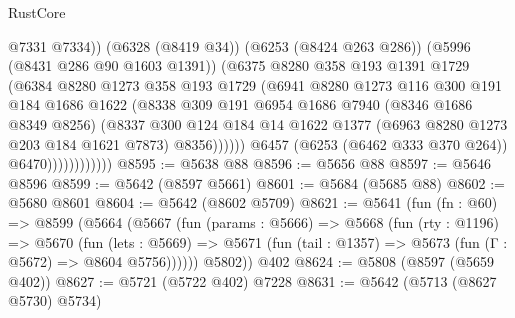 \begin{lexlean}{RustCore}
\begin{coremodule}
                                  @7331
                                  @7334))
                              (@6328 (@8419 @34))
                              (@6253 (@8424 @263 @286))
                              (@5996 (@8431 @286 @90 @1603 @1391))
                              (@6375
                                @8280
                                @358
                                @193
                                @1391
                                @1729
                                (@6384
                                  @8280
                                  @1273
                                  @358
                                  @193
                                  @1729
                                  (@6941
                                    @8280
                                    @1273
                                    @116
                                    @300
                                    @191
                                    @184
                                    @1686
                                    @1622
                                    (@8338
                                      @309
                                      @191
                                      @6954
                                      @1686
                                      @7940
                                      (@8346 @1686 @8349 @8256)
                                      (@8337
                                        @300
                                        @124
                                        @184
                                        @14
                                        @1622
                                        @1377
                                        (@6963 @8280 @1273 @203 @184 @1621 @7873)
                                        @8356))))))
                            @6457
                            (@6253 (@6462 @333 @370 @264))
                            @6470))))))))))))
@8595 := @5638 @88
@8596 := @5656 @88
@8597 := @5646 @8596
@8599 := @5642 (@8597 @5661)
@8601 := @5684 (@5685 @88)
@8602 := @5680 @8601
@8604 := @5642 (@8602 @5709)
@8621 := @5641
    (fun (fn : @60) =>
    @8599
      (@5664
        (@5667
          (fun (params : @5666) =>
          @5668
            (fun (rty : @1196) =>
            @5670
              (fun (lets : @5669) =>
              @5671 (fun (tail : @1357) => @5673 (fun (Γ : @5672) => @8604 @5756))))))
        @5802))
    @402
@8624 := @5808 (@8597 (@5659 @402))
@8627 := @5721 (@5722 @402) @7228
@8631 := @5642 (@5713 (@8627 @5730) @5734)

\end{coremodule}
\end{lexlean}
